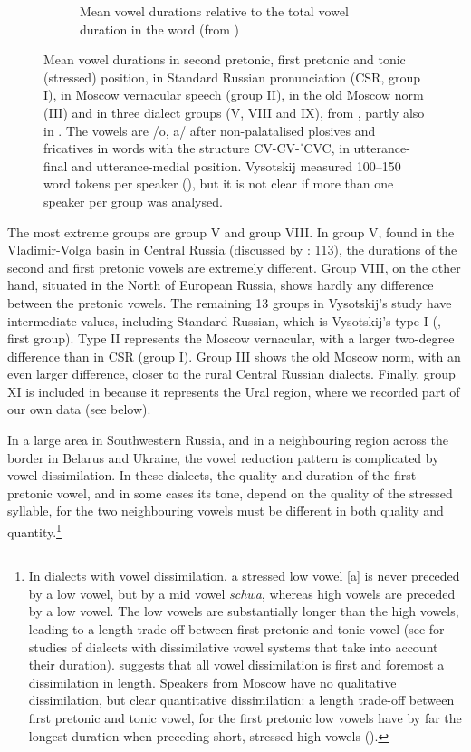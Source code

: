 \documentclass[output=paper]{langscibook}
\begin{document}
\begin{figure}[h]
\begin{subfigure}{\textwidth}
\caption{Mean vowel durations relative to the total vowel duration in the word (from \protect\citealt{Vysotskij1973})}
\end{subfigure}
\caption{\label{fig:post:1}Mean vowel durations in second pretonic, first pretonic and tonic (stressed) position, in Standard Russian pronunciation (CSR, group I), in Moscow vernacular speech (group II), in the old Moscow norm (III) and in three dialect groups (V, VIII and IX), from \citet[38]{Vysotskij1973}, partly also in \citet[131]{Bethin2006}. The vowels are /o, a/ after non-palatalised plosives and fricatives in words with the structure CV-CV-ˈCVC, in utterance-final and utterance-medial position. Vysotskij measured 100–150 word tokens per speaker (\citeyear[33]{Vysotskij1973}), but it is not clear if more than one speaker per group was analysed.}
\end{figure}

The most extreme groups are group V and group VIII. In group V, found in the Vladimir-Volga basin in Central Russia (discussed by \citealt{Bethin2006}: 113), the durations of the second and first pretonic vowels are extremely different. Group VIII, on the other hand, situated in the North of European Russia, shows hardly any difference between the pretonic vowels. The remaining 13 groups in Vysotskij’s study have intermediate values, including Standard Russian, which is Vysotskij’s type I (, first group). Type II represents the Moscow vernacular, with a larger two-degree difference than in CSR (group I). Group III shows the old Moscow norm, with an even larger difference, closer to the rural Central Russian dialects. Finally, group XI is included in  because it represents the Ural region, where we recorded part of our own data (see  below).

In a large area in Southwestern Russia, and in a neighbouring region across the border in Belarus and Ukraine, the vowel reduction pattern is complicated by vowel dissimilation. In these dialects, the quality and duration of the first pretonic vowel, and in some cases its tone, depend on the quality of the stressed syllable, for the two neighbouring vowels must be different in both quality and quantity.\footnote{In dialects with vowel dissimilation, a stressed low vowel [a] is never preceded by a low vowel, but by a mid vowel \textit{schwa}, whereas high vowels are preceded by a low vowel. The low vowels are substantially longer than the high vowels, leading to a length trade-off between first pretonic and tonic vowel (see \citealt{Čekmonas2001, Almuxamedova1985, Kasatkina2005, Bethin2006, Savinov2013, Djačenko2015} for studies of dialects with dissimilative vowel systems that take into account their duration). \citet{Iosad2012} suggests that all vowel dissimilation is first and foremost a dissimilation in length. Speakers from Moscow have no qualitative dissimilation, but clear quantitative dissimilation: a length trade-off between first pretonic and tonic vowel, for the first pretonic low vowels have by far the longest duration when preceding short, stressed high vowels (\citealt{Kasatkina2005, Iosad2012}).}
\end{document}
